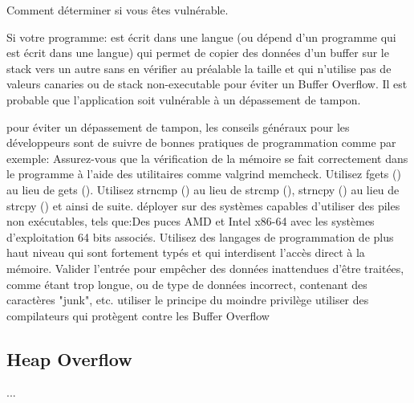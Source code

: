 Comment déterminer si vous êtes vulnérable.\newline 

Si votre programme:\newline 
est écrit dans une langue (ou dépend d'un programme qui est écrit dans une langue) qui permet de copier des données d'un buffer sur le stack vers un autre sans en vérifier au préalable la taille et qui n'utilise pas de valeurs canaries ou de stack non-executable pour éviter un Buffer Overflow. Il est probable que l'application soit vulnérable à un dépassement de tampon.\newline 

pour éviter un dépassement de tampon, les conseils généraux pour les développeurs sont de suivre de bonnes pratiques de programmation comme par exemple:\newline 
Assurez-vous que la vérification de la mémoire se fait correctement dans le programme à l'aide des utilitaires comme valgrind memcheck.
Utilisez fgets () au lieu de gets ().
Utilisez strncmp () au lieu de strcmp (), strncpy () au lieu de strcpy () et ainsi de suite. déployer sur des systèmes capables d'utiliser des piles non exécutables, tels que:Des puces AMD et Intel x86-64  avec les systèmes d'exploitation 64 bits associés.
Utilisez des langages de programmation de plus haut niveau qui sont fortement typés et qui interdisent l'accès direct à la mémoire.
Valider l'entrée pour empêcher  des données inattendues d'être traitées, comme étant trop longue, ou de type de données incorrect, contenant des caractères "junk", etc.
utiliser le principe du moindre privilège
utiliser des compilateurs qui protègent contre les Buffer Overflow 

\subsection{Heap Overflow}\label{vulnerabilites:applicatives:buffer-overflow:heap}

...

\endinput
